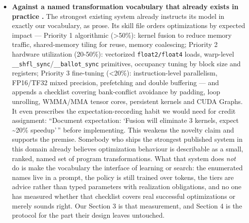 \documentclass[
  11pt,
]{article}
\begin{document}
\begin{itemize}
  \textbf{Against plan/action unification \cite{executable33,recode34}.} Two agent-side results make a representation claim here, and they cut against us. CodeAct replaces text/JSON tool calls with executable Python as a \emph{unified action space} and reports up to 20\% higher success across 17 models \cite{executable33} --- direct evidence that the action representation is not neutral, which is the shape of our thesis minus its kernel specificity. ReCode goes further and dissolves the boundary between planning and acting altogether, treating high-level plans as placeholder functions recursively expanded into primitive actions with dynamic granularity control \cite{recode34}; that is, in another domain, close to the Structured-action condition of Section 4. Neither is about GPU kernels, neither freezes a typed transformation vocabulary, neither reports whether such a vocabulary covers real successful optimizations, and --- crucially --- neither runs a Free-plan control of the kind Section 4.1 insists on. The consequence is that the Section 4.3 branch \(\mathrm{Free\text{-}plan} \approx \mathrm{Structured\text{-}action} \Rightarrow \text{no paper}\) is a live risk that adjacent fields have not resolved either, and what is left to claim is: the descriptive measurement in Section 3, the falsification discipline, and the kernel-specific confound controls that only this domain forces (autotune isolation, backend substitution).
\item
  \textbf{Against a named transformation vocabulary that already exists in practice \cite{cuda1}.} The strongest existing system already instructs its model in exactly our vocabulary, as prose. Its skill file orders optimizations by expected impact --- Priority 1 algorithmic (\textgreater50\%): kernel fusion to reduce memory traffic, shared-memory tiling for reuse, memory coalescing; Priority 2 hardware utilization (20-50\%): vectorized \texttt{float2/float4} loads, warp-level \texttt{\_\_shfl\_sync}/\texttt{\_\_ballot\_sync} primitives, occupancy tuning by block size and registers; Priority 3 fine-tuning (\textless20\%): instruction-level parallelism, FP16/TF32 mixed precision, prefetching and double buffering --- and appends a checklist covering bank-conflict avoidance by padding, loop unrolling, WMMA/MMA tensor cores, persistent kernels and CUDA Graphs. It even prescribes the expectation-recording habit we would need for credit assignment: ``Document expectation: `Fusion will eliminate 3 kernels, expect \textasciitilde20\% speedup'\,'' before implementing. This weakens the novelty claim and supports the premise. Somebody who ships the strongest published system in this domain already believes optimization behaviour is describable as a small, ranked, named set of program transformations. What that system does \emph{not} do is make the vocabulary the interface of learning or search: the enumerated names live in a prompt, the policy is still trained over tokens, the tiers are advice rather than typed parameters with realization obligations, and no one has measured whether that checklist covers real successful optimizations or merely sounds right. Our Section 3 is that measurement, and Section 4 is the protocol for the part their design leaves untouched.
\end{itemize}
\end{document}
